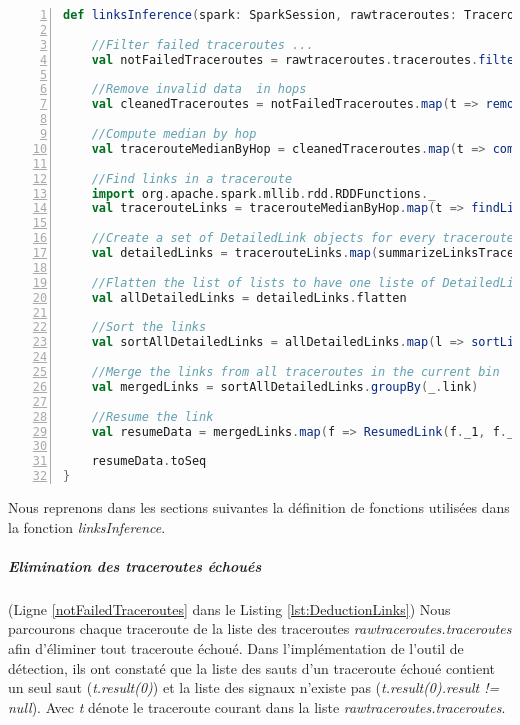 \begin{lstlisting}[language=scala,firstnumber=1, caption={Deduction des liens par groupe de traceroutes},label={lst:DeductionLinks}, basicstyle = \footnotesize,escapechar=|,numbers=left,
stepnumber=1]
 def linksInference(spark: SparkSession, rawtraceroutes: TraceroutesPerPeriod): Seq[ResumedLink] = {
	
	//Filter failed traceroutes ... 
	val notFailedTraceroutes = rawtraceroutes.traceroutes.filter(t => t.result(0).result != null) |\label{notFailedTraceroutes}|
	
	//Remove invalid data  in hops
	val cleanedTraceroutes = notFailedTraceroutes.map(t => removeInvalidSignals(t)) |\label{cleanedTraceroutes}|
	
	//Compute median by hop
	val tracerouteMedianByHop = cleanedTraceroutes.map(t => computeMedianRTTByhop(t)) |\label{tracerouteMedianByHopline}|
	
	//Find links in a traceroute
	import org.apache.spark.mllib.rdd.RDDFunctions._
	val tracerouteLinks = tracerouteMedianByHop.map(t => findLinksAndRttDiffByTraceroute(spark, t)) |\label{tracerouteLinksline}|
	
	//Create a set of DetailedLink objects for every traceroute
	val detailedLinks = tracerouteLinks.map(summarizeLinksTraceroute) |\label{liens-par-périodeline}|
	
	//Flatten the list of lists to have one liste of DetailedLink objects
	val allDetailedLinks = detailedLinks.flatten
	
	//Sort the links
	val sortAllDetailedLinks = allDetailedLinks.map(l => sortLinks(l))
	
	//Merge the links from all traceroutes in the current bin
	val mergedLinks = sortAllDetailedLinks.groupBy(_.link)
	
	//Resume the link 
	val resumeData = mergedLinks.map(f => ResumedLink(f._1, f._2.map(_.probe), f._2.map(_.rttDiff), generateDatesSample(f._2.size, rawtraceroutes.timeWindow)))
	
	resumeData.toSeq    
}
\end{lstlisting}


Nous reprenons dans les sections suivantes la définition de fonctions utilisées dans la fonction \textit{linksInference}.

\subparagraph{Elimination des traceroutes échoués} (Ligne \ref{notFailedTraceroutes} dans le Listing \ref{lst:DeductionLinks}) Nous parcourons chaque traceroute de la liste des traceroutes \textit{rawtraceroutes.traceroutes} afin d'éliminer tout traceroute échoué. Dans l'implémentation de l'outil de détection, ils ont constaté que la liste des sauts d'un traceroute échoué contient un seul saut (\textit{t.result(0)}) et la liste des signaux n'existe pas (\textit{t.result(0).result != null}). Avec \textit{t} dénote le traceroute courant dans la liste \textit{rawtraceroutes.traceroutes}. 


